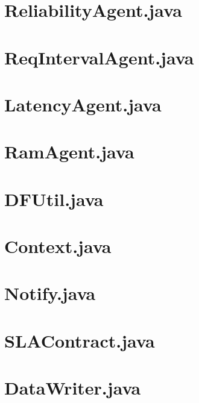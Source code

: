 \section{ReliabilityAgent.java}


\section{ReqIntervalAgent.java}


\section{LatencyAgent.java}


\section{RamAgent.java}


\section{DFUtil.java}


\section{Context.java}


\section{Notify.java}


\section{SLAContract.java}


\section{DataWriter.java}


